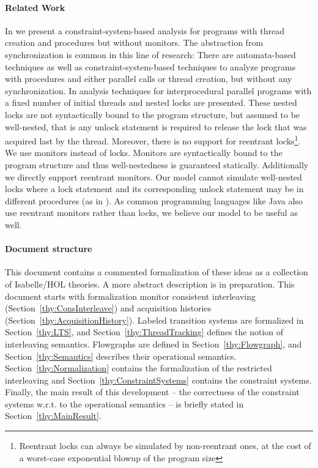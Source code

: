 \documentclass[11pt,a4paper]{article}
\begin{document}
  \paragraph{Related Work}
  In \cite{LM07} we present a constraint-system-based analysis for programs with thread creation and procedures but without monitors. The abstraction from synchronization is common in this line of research:
  There are automata-based techniques \cite{BMT05,EK99,EP00} as well as constraint-system-based techniques \cite{SeSt00,LM07} to analyze programs with procedures and either parallel calls or thread creation, but without any 
  synchronization. In \cite{KIG05,KG06} analysis techniques for interprocedural parallel programs with a fixed number of initial threads and nested locks are presented. These nested locks are not syntactically bound to the program 
  structure, but assumed to be well-nested, that is any unlock statement is required to release the lock that was acquired last by the thread. Moreover, there is no support for reentrant 
  locks\footnote{Reentrant locks can always be simulated by non-reentrant ones, at the cost of a worst-case exponential blowup of the program size}. 
  We use monitors instead of locks. Monitors are syntactically bound to the program structure and thus well-nestedness is guaranteed statically. Additionally we directly support reentrant monitors. Our model cannot simulate 
  well-nested locks where a lock statement and its corresponding unlock statement may be in different procedures (as in \cite{KIG05,KG06}). As common programming languages like Java also use reentrant monitors rather than locks, 
  we believe our model to be useful as well.

  \paragraph{Document structure}
  This document contains a commented formalization of these ideas as a collection of Isabelle/HOL theories. A more abstract description is in preparation.
  This document starts with formalization monitor consistent interleaving 
  (Section~\ref{thy:ConsInterleave}) and acquisition histories (Section~\ref{thy:AcquisitionHistory}). Labeled transition systems are formalized in Section~\ref{thy:LTS}, and Section~\ref{thy:ThreadTracking} defines
  the notion of interleaving semantics. Flowgraphs are defined in Section~\ref{thy:Flowgraph}, and Section~\ref{thy:Semantics} describes their operational semantics. Section~\ref{thy:Normalization} contains the formalization of
  the restricted interleaving and Section~\ref{thy:ConstraintSystems} contains the constraint systems. Finally, the main result of this development -- the correctness of the constraint systems w.r.t. to the operational semantics -- 
  is briefly stated in Section~\ref{thy:MainResult}.
\end{document}
